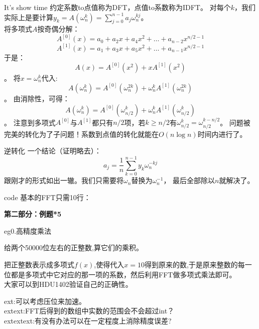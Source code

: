 \documentclass[allowframebreaks,10pt]{beamer}
\begin{document}
\begin{frame}{It's show time}
约定系数to点值称为DFT，点值to系数称为IDFT。
\pause
对每个$k$，我们实际上是要计算$y_k = A(\omega_n^k) = \sum_{j=0}^{n-1}a_j \omega_n^{kj}$。
\pause
\\ 将多项式$A$按奇偶分解：
\pause
\[ A^{[0]}(x) = a_0 + a_2x + a_4x^2 + \ldots + 
a_{n-2}x^{n/2-1}\]
\pause
\[ A^{[1]}(x) = a_1 + a_3x + a_5x^2 + \ldots + 
a_{n-1}x^{n/2-1}\]
\pause
于是：
\[ A(x) = A^{[0]}(x^2) + x A^{[1]}(x^2)\]。
\pause
将$x=\omega_n^k$代入:
\[ A(\omega_n^k) = A^{[0]}(\omega_n^{2k}) + \omega_n^k A^{[1]}(\omega_n^{2k})\]。
\pause
由消除性，可得：
\[ A(\omega_n^k) = A^{[0]}(\omega_{n/2}^{k}) + \omega_n^k A^{[1]}(\omega_{n/2}^{k})\]。
\pause
注意到多项式$A^{[0]}$与$A^{[1]}$都只有$n/2$项，若$k \ge n/2$有$\omega_{n/2}^k = \omega_{n/2}^{k-n/2}$。
\pause
问题被完美的转化为了子问题！系数到点值的转化就能在$O(n \log n)$时间内进行了。
\end{frame}
\begin{frame}{逆转化}
\pause
一个结论（证明略去）：
\[ a_j = \frac{1}{n} \sum_{k=0}^{n-1} y_k \omega_n^{-kj}\]
\pause
跟刚才的形式如出一辙。我们只需要将$\omega_n$替换为$\omega_n^{-1}$，
最后全部除以$n$就解决了。
\end{frame}

\begin{frame}{code}
基本的FFT只需10行：\\[1ex]
{\footnotesize

}
\end{frame}

\begin{frame}[plain]
\begin{center}
\textbf{第二部分：例题*5}
\end{center}
\end{frame}

\begin{frame}{eg0.高精度乘法}
\begin{example}
给两个50000位左右的正整数,算它们的乘积。
\end{example}
\pause
\begin{solution}
把正整数表示成多项式$f(x)$,使得代入$x=10$得到原来的数,于是原来整数的每一位都是多项式中它对应的那一项的系数，然后利用FFT做多项式乘法即可。
\\ 大家可以到HDU1402验证自己的正确性。
\end{solution}
\pause
ext:可以考虑压位来加速。\\
\pause
extext:FFT后得到的数组中实数的范围会不会超过int？ \\
\pause
extextext:有没有办法可以在一定程度上消除精度误差? 
\end{frame}
\end{document}
